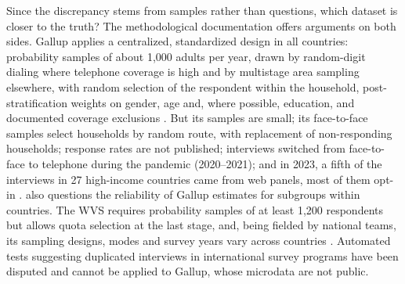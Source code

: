 \documentclass[12pt]{article}
\begin{document}
Since the discrepancy stems from samples rather than questions, which dataset is closer to the truth? The methodological documentation offers arguments on both sides. Gallup applies a centralized, standardized design in all countries: probability samples of about 1,000 adults per year, drawn by random-digit dialing where telephone coverage is high and by multistage area sampling elsewhere, with random selection of the respondent within the household, post-stratification weights on gender, age and, where possible, education, and documented coverage exclusions \citep{gallup_methodology_2023}. But its samples are small; its face-to-face samples select households by random route, with replacement of non-responding households; response rates are not published; interviews switched from face-to-face to telephone during the pandemic (2020--2021); and in 2023, a fifth of the interviews in 27 high-income countries came from web panels, most of them opt-in \citep{gallup_methodology_2023}. \citet{blanchflower_gallup_2024} also questions the reliability of Gallup estimates for subgroups within countries. 
The WVS requires probability samples of at least 1,200 respondents but allows quota selection at the last stage, and, being fielded by national teams, its sampling designs, modes and survey years vary across countries \citep{wvs_rules_wave8}. Automated tests suggesting duplicated interviews in international survey programs \citep{kuriakose_dont_2016} have been disputed \citep{pew_data_2016} and cannot be applied to Gallup, whose microdata are not public. %
\end{document}
